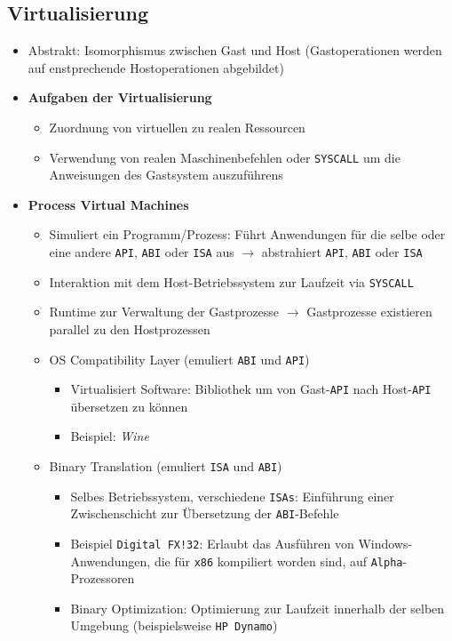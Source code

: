 \subsection{Virtualisierung}
\begin{itemize}
	\item Abstrakt: Isomorphismus zwischen Gast und Host (Gastoperationen werden auf enstprechende Hostoperationen abgebildet)
	\item \textbf{Aufgaben der Virtualisierung}
	\begin{itemize}
		\item Zuordnung von virtuellen zu realen Ressourcen
		\item Verwendung von realen Maschinenbefehlen oder \texttt{SYSCALL} um die Anweisungen des Gastsystem auszuführens
	\end{itemize}
	\item \textbf{Process Virtual Machines}
	\begin{itemize}
		\item Simuliert ein Programm/Prozess: Führt Anwendungen für die selbe oder eine andere \texttt{API}, \texttt{ABI} oder \texttt{ISA} aus \(\rightarrow\) abstrahiert \texttt{API}, \texttt{ABI} oder \texttt{ISA}
		\item Interaktion mit dem Host-Betriebssystem zur Laufzeit via \texttt{SYSCALL}
		\item Runtime zur Verwaltung der Gastprozesse \(\rightarrow\) Gastprozesse existieren parallel zu den Hostprozessen
		\item OS Compatibility Layer (emuliert \texttt{ABI} und \texttt{API})
		\begin{itemize}
			\item Virtualisiert Software: Bibliothek um von Gast-\texttt{API} nach Host-\texttt{API} übersetzen zu können
			\item Beispiel: \textit{Wine}
		\end{itemize}
		\item Binary Translation (emuliert \texttt{ISA} und \texttt{ABI})
		\begin{itemize}
			\item Selbes Betriebssystem, verschiedene \texttt{ISAs}: Einführung einer Zwischenschicht zur Übersetzung der \texttt{ABI}-Befehle
			\item Beispiel \texttt{Digital FX!32}: Erlaubt das Ausführen von Windows-Anwendungen, die für \texttt{x86} kompiliert worden sind, auf \texttt{Alpha}-Prozessoren
			\item Binary Optimization: Optimierung zur Laufzeit innerhalb der selben Umgebung (beispielsweise \texttt{HP Dynamo})

\end{itemize}
\end{itemize}
\end{itemize}
